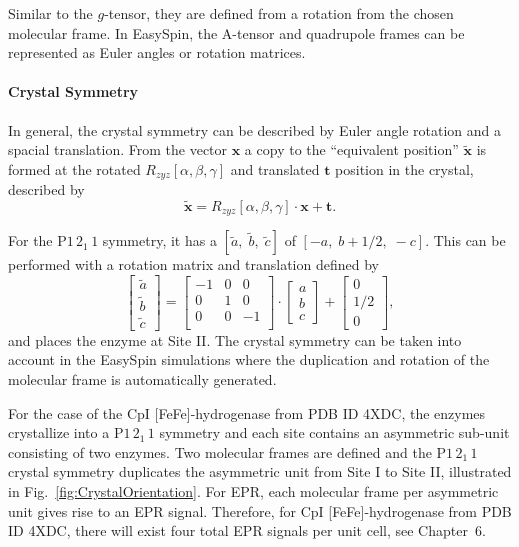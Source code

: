 Similar to the $g$-tensor, they are defined from a rotation from the chosen molecular frame. In EasySpin, the A-tensor and quadrupole frames can be represented as Euler angles or rotation matrices. 

\paragraph*{Crystal Symmetry} In general, the crystal symmetry can be described by Euler angle rotation and a spacial translation. \cite{hovmoller1981rotation} From the vector $\mathbf{x}$ a copy to the ``equivalent position'' $\mathbf{\tilde{x}}$ is formed at the rotated $R_{zyz}[\alpha,\beta,\gamma]$ and translated $\mathbf{t}$ position in the crystal, described by
\begin{equation}
\mathbf{\tilde{x}} = R_{zyz}[\alpha,\beta,\gamma] \cdot \mathbf{x} + \mathbf{t}.
\end{equation}

For the P$1\,2_1\,1$ symmetry, it has a $[\tilde{a},\;\tilde{b},\;\tilde{c}]$ of $[-a,\;b+1/2,\;-c]$. This can be performed with a rotation matrix and translation defined by 
\begin{equation}
     \begin{bmatrix}
  \tilde{a} \\
  \tilde{b} \\
  \tilde{c} 
  \end{bmatrix} = \begin{bmatrix}
   -1 & 0 & 0\\
    0 & 1 & 0\\
    0 &  0 & -1\\
   \end{bmatrix} \cdot      \begin{bmatrix}
  a \\
  b \\
  c 
  \end{bmatrix} + \begin{bmatrix}
  0 \\
  1/2 \\
  0 
  \end{bmatrix},
\end{equation}
and places the enzyme at Site II. The crystal symmetry can be taken into account in the EasySpin simulations where the duplication and rotation of the molecular frame is automatically generated. 

For the case of the CpI [FeFe]-hydrogenase from PDB ID 4XDC,\cite{FeFeCry} the enzymes crystallize into a P$1\,2_1\,1$ symmetry and each site contains an asymmetric sub-unit consisting of two enzymes. Two molecular frames are defined and the P$1\,2_1\,1$ crystal symmetry duplicates the asymmetric unit from Site I to Site II, illustrated in Fig.~\ref{fig:CrystalOrientation}. For EPR, each molecular frame per asymmetric unit gives rise to an EPR signal. Therefore, for CpI [FeFe]-hydrogenase from PDB ID 4XDC, there will exist four total EPR signals per unit cell, see Chapter~6.

